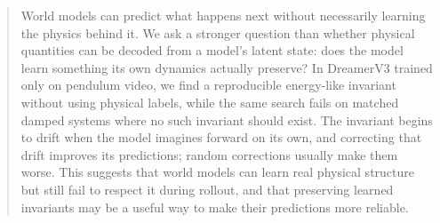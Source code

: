 \begin{abstract}
World models can predict what happens next without necessarily learning the physics behind it. We
ask a stronger question than whether physical quantities can be decoded from a model's latent state:
does the model learn something its own dynamics actually preserve? In DreamerV3 trained only on
pendulum video, we find a reproducible energy-like invariant without using physical labels, while
the same search fails on matched damped systems where no such invariant should exist. The invariant
begins to drift when the model imagines forward on its own, and correcting that drift improves its
predictions; random corrections usually make them worse. This suggests that world models can learn
real physical structure but still fail to respect it during rollout, and that preserving learned
invariants may be a useful way to make their predictions more reliable.
\end{abstract}
